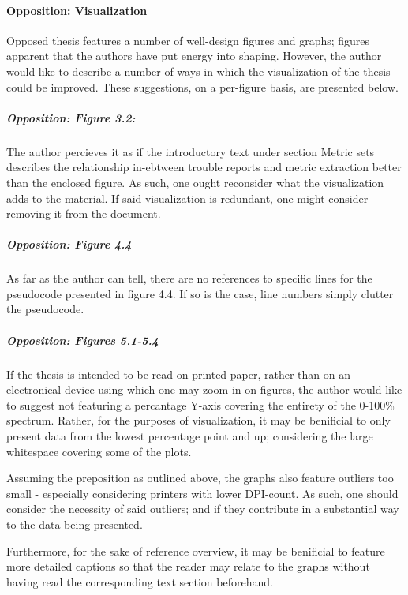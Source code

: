 
\paragraph{Opposition: Visualization}
\label{par:oppositionvisualization}
Opposed thesis features a number of well-design figures and graphs; figures apparent that the authors have put energy into shaping.
However, the author would like to describe a number of ways in which the visualization of the thesis could be improved.
These suggestions, on a per-figure basis, are presented below.

\subparagraph{Opposition: Figure 3.2:}
\label{par:oppositionvisualization_figurethreepointtwo}
The author percieves it as if the introductory text under section Metric sets describes the relationship in-ebtween trouble reports and metric extraction better than the enclosed figure.
As such, one ought reconsider what the visualization adds to the material.
If said visualization is redundant, one might consider removing it from the document.

\subparagraph{Opposition: Figure 4.4}
\label{par:oppositionvisualization_figurefourpointfour}
As far as the author can tell, there are no references to specific lines for the pseudocode presented in figure 4.4.
If so is the case, line numbers simply clutter the pseudocode.

\subparagraph{Opposition: Figures 5.1-5.4}
\label{par:oppositionvisualization_figuresfivepointonetofivepointfour}
If the thesis is intended to be read on printed paper, rather than on an electronical device using which one may zoom-in on figures, the author would like to suggest not featuring a percantage Y-axis covering the entirety of the 0-100\% spectrum.
Rather, for the purposes of visualization, it may be benificial to only present data from the lowest percentage point and up; considering the large whitespace covering some of the plots.

Assuming the preposition as outlined above, the graphs also feature outliers too small - especially considering printers with lower DPI-count.
As such, one should consider the necessity of said outliers; and if they contribute in a substantial way to the data being presented.

Furthermore, for the sake of reference overview, it may be benificial to feature more detailed captions so that the reader may relate to the graphs without having read the corresponding text section beforehand.

